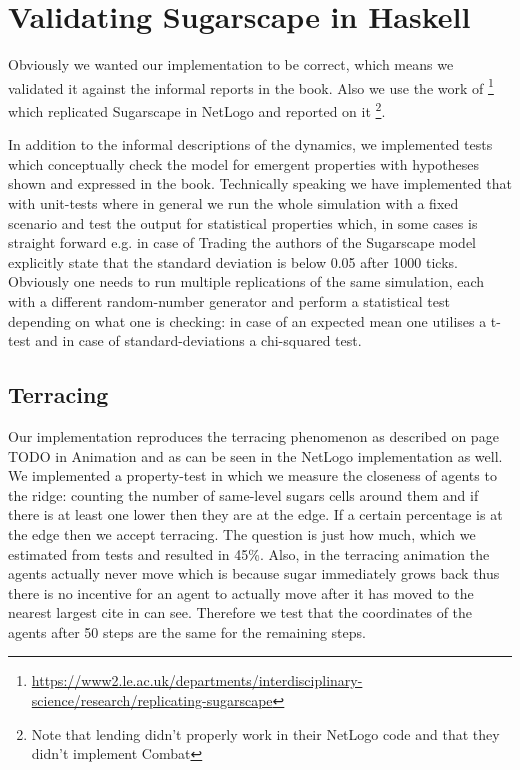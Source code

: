 \section{Validating Sugarscape in Haskell}
\label{app:validation}
Obviously we wanted our implementation to be correct, which means we validated it against the informal reports in the book. Also we use the work of \cite{weaver_replicating_2009} \footnote{\url{https://www2.le.ac.uk/departments/interdisciplinary-science/research/replicating-sugarscape}} which replicated Sugarscape in NetLogo and reported on it \footnote{Note that lending didn't properly work in their NetLogo code and that they didn't implement Combat}.

In addition to the informal descriptions of the dynamics, we implemented tests which conceptually check the model for emergent properties with hypotheses shown and expressed in the book. Technically speaking we have implemented that with unit-tests where in general we run the whole simulation with a fixed scenario and test the output for statistical properties which, in some cases is straight forward e.g. in case of Trading the authors of the Sugarscape model explicitly state that the standard deviation is below 0.05 after 1000 ticks.
Obviously one needs to run multiple replications of the same simulation, each with a different random-number generator and perform a statistical test depending on what one is checking: in case of an expected mean one utilises a t-test and in case of standard-deviations a chi-squared test. 

\subsection{Terracing}
Our implementation reproduces the terracing phenomenon as described on page TODO in Animation and as can be seen in the NetLogo implementation as well. We implemented a property-test in which we measure the closeness of agents to the ridge: counting the number of same-level sugars cells around them and if there is at least one lower then they are at the edge. If a certain percentage is at the edge then we accept terracing. The question is just how much, which we estimated from tests and resulted in 45\%. Also, in the terracing animation the agents actually never move which is because sugar immediately grows back thus there is no incentive for an agent to actually move after it has moved to the nearest largest cite in can see. Therefore we test that the coordinates of the agents after 50 steps are the same for the remaining steps.

